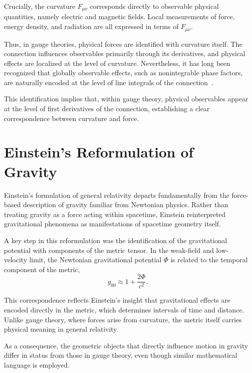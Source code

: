 \documentclass[12pt,letterpaper]{article}
\begin{document}
Crucially, the curvature $F_{\mu\nu}$ corresponds directly to observable physical quantities, namely electric and magnetic fields.  
Local measurements of force, energy density, and radiation are all expressed in terms of $F_{\mu\nu}$.

Thus, in gauge theories, physical forces are identified with curvature itself. The connection influences observables primarily through its derivatives, and physical effects are localized at the level of curvature. Nevertheless, it has long been recognized that globally observable effects, such as nonintegrable phase factors, are naturally encoded at the level of line integrals of the connection~\cite{WuYang}.

This identification implies that, within gauge theory, physical observables appear at the level of first derivatives of the connection, establishing a clear correspondence between curvature and force.

\section{Einstein's Reformulation of Gravity}

\justifying
Einstein's formulation of general relativity departs fundamentally from the force-based description of gravity familiar from Newtonian physics. Rather than treating gravity as a force acting within spacetime, Einstein reinterpreted gravitational phenomena as manifestations of spacetime geometry itself.

A key step in this reformulation was the identification of the gravitational potential with components of the metric tensor. In the weak-field and low-velocity limit, the Newtonian gravitational potential $\Phi$ is related to the temporal component of the metric,
\begin{equation}
g_{00} \approx 1 + \frac{2\Phi}{c^2}.
\end{equation}

This correspondence reflects Einstein's insight that gravitational effects are encoded directly in the metric, which determines intervals of time and distance. Unlike gauge theory, where forces arise from curvature, the metric itself carries physical meaning in general relativity.

As a consequence, the geometric objects that directly influence motion in gravity differ in status from those in gauge theory, even though similar mathematical language is employed.
\end{document}

